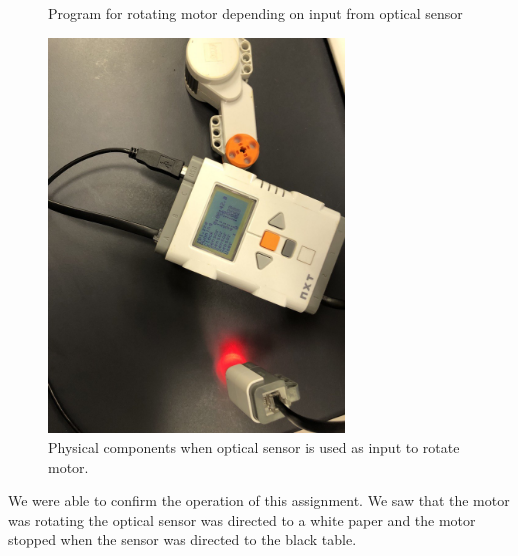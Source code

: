 \documentclass[12pt,a4paper]{report}
\begin{document}
\begin{enumerate}
\begin{figure}[htbp]
        \caption{Program for rotating motor depending on input from optical sensor}\label{fig:ass1-3-1}
    \end{figure}
    \begin{figure}[htbp]
        \includegraphics[width=0.7\textwidth]{figures/ass1-3-2.jpg}
        \caption{Physical components when optical sensor is used as input to rotate motor.}\label{fig:ass1-3-2}
    \end{figure}
    We were able to confirm the operation of this assignment. We saw that the motor was rotating the optical 
    sensor was directed to a white paper and the motor stopped when the sensor was directed to the black table. 
\end{enumerate}
\end{document}
